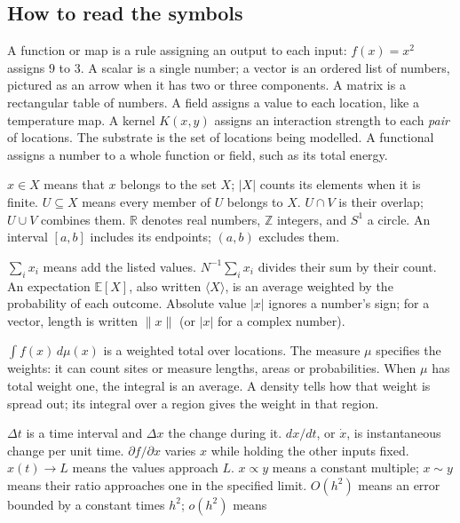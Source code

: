 \documentclass[11pt]{article}
\newcommand{\R}{\mathbb{R}}
\newcommand{\Z}{\mathbb{Z}}
\newcommand{\E}{\mathbb{E}}
\begin{document}
\subsection{How to read the symbols}

A function or map is a rule assigning an output to each input: $f(x)=x^2$
assigns $9$ to $3$. A scalar is a single number; a vector is an ordered list
of numbers, pictured as an arrow when it has two or three components. A matrix
is a rectangular table of numbers. A field assigns a value to each location,
like a temperature map. A kernel $K(x,y)$ assigns an interaction strength to
each \emph{pair} of locations. The substrate is the set of locations being
modelled. A functional assigns a number to a whole function or field, such as
its total energy.

\begin{description}[leftmargin=*,style=nextline]
\item[Sets and membership.] $x\in X$ means that $x$ belongs to the set $X$;
$|X|$ counts its elements when it is finite. $U\subseteq X$ means every member
of $U$ belongs to $X$. $U\cap V$ is their overlap; $U\cup V$ combines them.
$\R$ denotes real numbers, $\Z$ integers, and $S^1$ a circle. An interval
$[a,b]$ includes its endpoints; $(a,b)$ excludes them.
\item[Sums and averages.] $\sum_i x_i$ means add the listed values.
$N^{-1}\sum_i x_i$ divides their sum by their count. An expectation
$\E[X]$, also written $\langle X\rangle$, is an average weighted by the
probability of each outcome. Absolute value $|x|$ ignores a number's sign;
for a vector, length is written $\|x\|$ (or $|x|$ for a complex number).
\item[Integrals and measures.] $\int f(x)\,d\mu(x)$ is a weighted total over
locations. The measure $\mu$ specifies the weights: it can count sites or
measure lengths, areas or probabilities. When $\mu$ has total weight one,
the integral is an average. A density tells how that weight is spread out;
its integral over a region gives the weight in that region.
\item[Change and limits.] $\Delta t$ is a time interval and $\Delta x$ the
change during it. $dx/dt$, or $\dot x$, is instantaneous change per unit time.
$\partial f/\partial x$ varies $x$ while holding the other inputs fixed.
$x(t)\to L$ means the values approach $L$. $x\propto y$ means a constant
multiple; $x\sim y$ means their ratio approaches one in the specified limit.
$O(h^2)$ means an error bounded by a constant times $h^2$; $o(h^2)$ means

\end{description}
\end{document}
